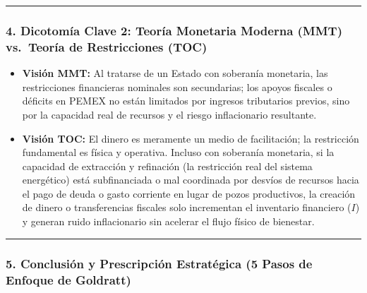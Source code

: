 \documentclass[12pt,letterpaper]{article}
\providecommand{\tightlist}{%
  \setlength{\itemsep}{0pt}\setlength{\parskip}{0pt}}
\begin{document}
\begin{center}\rule{0.5\linewidth}{0.5pt}\end{center}

\hypertarget{dicotomuxeda-clave-2-teoruxeda-monetaria-moderna-mmt-vs.-teoruxeda-de-restricciones-toc}{%
\subsubsection{4. Dicotomía Clave 2: Teoría Monetaria Moderna (MMT)
vs.~Teoría de Restricciones
(TOC)}\label{dicotomuxeda-clave-2-teoruxeda-monetaria-moderna-mmt-vs.-teoruxeda-de-restricciones-toc}}

\begin{itemize}
\tightlist
\item
  \textbf{Visión MMT:} Al tratarse de un Estado con soberanía monetaria,
  las restricciones financieras nominales son secundarias; los apoyos
  fiscales o déficits en PEMEX no están limitados por ingresos
  tributarios previos, sino por la capacidad real de recursos y el
  riesgo inflacionario resultante.
\item
  \textbf{Visión TOC:} El dinero es meramente un medio de facilitación;
  la restricción fundamental es física y operativa. Incluso con
  soberanía monetaria, si la capacidad de extracción y refinación (la
  restricción real del sistema energético) está subfinanciada o mal
  coordinada por desvíos de recursos hacia el pago de deuda o gasto
  corriente en lugar de pozos productivos, la creación de dinero o
  transferencias fiscales solo incrementan el inventario financiero
  (\(I\)) y generan ruido inflacionario sin acelerar el flujo físico de
  bienestar.
\end{itemize}

\begin{center}\rule{0.5\linewidth}{0.5pt}\end{center}

\hypertarget{conclusiuxf3n-y-prescripciuxf3n-estratuxe9gica-5-pasos-de-enfoque-de-goldratt}{%
\subsubsection{5. Conclusión y Prescripción Estratégica (5 Pasos de
Enfoque de
Goldratt)}\label{conclusiuxf3n-y-prescripciuxf3n-estratuxe9gica-5-pasos-de-enfoque-de-goldratt}}
\end{document}
